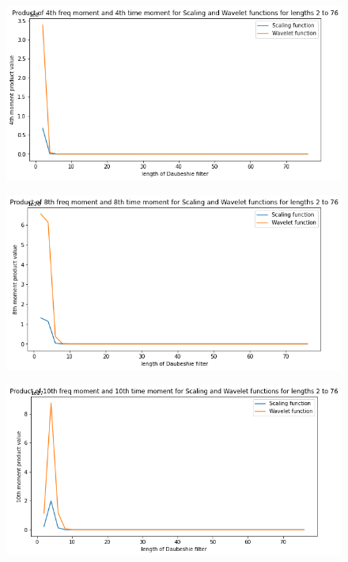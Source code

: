 \documentclass{article}
\begin{document}
\begin{figure}[H]
\begin{center}
\includegraphics[scale = 0.6]{prod4.png}
\end{center}
\end{figure}

\begin{figure}[H]
\begin{center}
\includegraphics[scale = 0.6]{prod8.png}
\end{center}
\end{figure}

\begin{figure}[H]
\begin{center}
\includegraphics[scale = 0.6]{prod10.png}
\end{center}
\end{figure}
\end{document}
